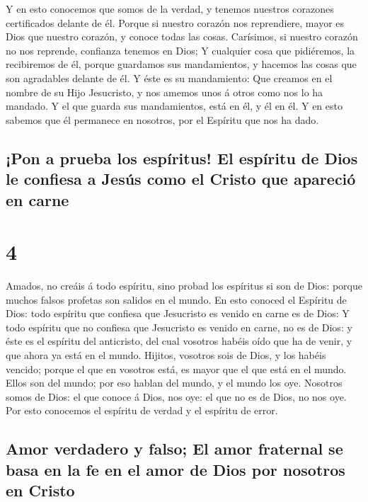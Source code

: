  Y en esto conocemos que somos de la verdad, y tenemos
nuestros corazones certificados delante de él.  Porque si
nuestro corazón nos reprendiere, mayor es Dios que nuestro corazón, y
conoce todas las cosas.  Carísimos, si nuestro corazón no
nos reprende, confianza tenemos en Dios;  Y cualquier cosa
que pidiéremos, la recibiremos de él, porque guardamos sus mandamientos,
y hacemos las cosas que son agradables delante de él.  Y
éste es su mandamiento: Que creamos en el nombre de su Hijo Jesucristo,
y nos amemos unos á otros como nos lo ha mandado.  Y el que
guarda sus mandamientos, está en él, y él en él. Y en esto sabemos que
él permanece en nosotros, por el Espíritu que nos ha dado.

\hypertarget{pon-a-prueba-los-espuxedritus-el-espuxedritu-de-dios-le-confiesa-a-jesuxfas-como-el-cristo-que-apareciuxf3-en-carne}{%
\subsection{¡Pon a prueba los espíritus! El espíritu de Dios le confiesa
a Jesús como el Cristo que apareció en
carne}\label{pon-a-prueba-los-espuxedritus-el-espuxedritu-de-dios-le-confiesa-a-jesuxfas-como-el-cristo-que-apareciuxf3-en-carne}}

\hypertarget{section-3}{%
\section{4}\label{section-3}}

 Amados, no creáis á todo espíritu, sino probad los
espíritus si son de Dios: porque muchos falsos profetas son salidos en
el mundo.  En esto conoced el Espíritu de Dios: todo
espíritu que confiesa que Jesucristo es venido en carne es de Dios:
 Y todo espíritu que no confiesa que Jesucristo es venido en
carne, no es de Dios: y éste es el espíritu del anticristo, del cual
vosotros habéis oído que ha de venir, y que ahora ya está en el mundo.
 Hijitos, vosotros sois de Dios, y los habéis vencido;
porque el que en vosotros está, es mayor que el que está en el mundo.
 Ellos son del mundo; por eso hablan del mundo, y el mundo
los oye.  Nosotros somos de Dios: el que conoce á Dios, nos
oye: el que no es de Dios, no nos oye. Por esto conocemos el espíritu de
verdad y el espíritu de error.

\hypertarget{amor-verdadero-y-falso-el-amor-fraternal-se-basa-en-la-fe-en-el-amor-de-dios-por-nosotros-en-cristo}{%
\subsection{Amor verdadero y falso; El amor fraternal se basa en la fe
en el amor de Dios por nosotros en
Cristo}\label{amor-verdadero-y-falso-el-amor-fraternal-se-basa-en-la-fe-en-el-amor-de-dios-por-nosotros-en-cristo}}


